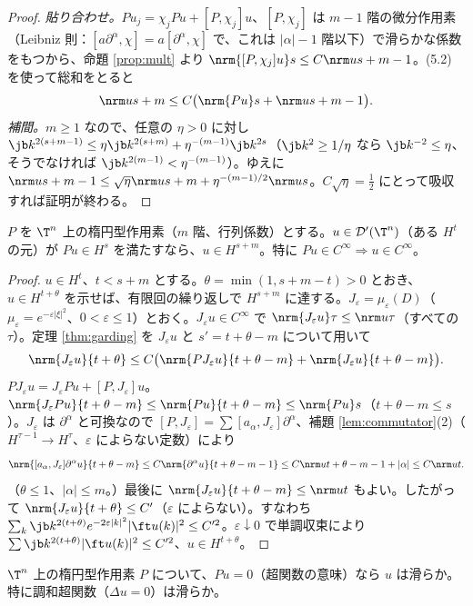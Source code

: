 \begin{proof}
\emph{貼り合わせ。}$Pu_j=\chi_jPu+[P,\chi_j]u$、$[P,\chi_j]$ は $m-1$ 階の微分作用素（Leibniz 則：$[a\partial^\alpha,\chi]=a[\partial^\alpha,\chi]$ で、これは $|\alpha|-1$ 階以下）で滑らかな係数をもつから、命題 \ref{prop:mult} より $\nrm{[P,\chi_j]u}s\le C\nrm u{s+m-1}$。(5.2) を使って総和をとると
\[
\nrm u{s+m}\le C\bigl(\nrm{Pu}s+\nrm u{s+m-1}\bigr).
\]
\emph{補間。}$m\ge1$ なので、任意の $\eta>0$ に対し $\jb k^{2(s+m-1)}\le\eta\jb k^{2(s+m)}+\eta^{-(m-1)}\jb k^{2s}$（$\jb k^2\ge1/\eta$ なら $\jb k^{-2}\le\eta$、そうでなければ $\jb k^{2(m-1)}<\eta^{-(m-1)}$）。ゆえに $\nrm u{s+m-1}\le\sqrt\eta\nrm u{s+m}+\eta^{-(m-1)/2}\nrm us$。$C\sqrt\eta=\frac12$ にとって吸収すれば証明が終わる。
\end{proof}

\begin{thm}[楕円正則性]\label{thm:regularity}\tP
$P$ を $\T^n$ 上の楕円型作用素（$m$ 階、行列係数）とする。$u\in\mathcal D'(\T^n)$（ある $H^t$ の元）が $Pu\in H^s$ を満たすなら、$u\in H^{s+m}$。特に $Pu\in C^\infty\Rightarrow u\in C^\infty$。
\end{thm}
\begin{proof}
$u\in H^t$、$t<s+m$ とする。$\theta=\min(1,s+m-t)>0$ とおき、$u\in H^{t+\theta}$ を示せば、有限回の繰り返しで $H^{s+m}$ に達する。$J_\varepsilon=\mu_\varepsilon(D)$（$\mu_\varepsilon=e^{-\varepsilon|\xi|^2}$、$0<\varepsilon\le1$）とおく。$J_\varepsilon u\in C^\infty$ で $\nrm{J_\varepsilon u}\tau\le\nrm u\tau$（すべての $\tau$）。定理 \ref{thm:garding} を $J_\varepsilon u$ と $s'=t+\theta-m$ について用いて
\[
\nrm{J_\varepsilon u}{t+\theta}\le C\bigl(\nrm{PJ_\varepsilon u}{t+\theta-m}+\nrm{J_\varepsilon u}{t+\theta-m}\bigr).
\]
$PJ_\varepsilon u=J_\varepsilon Pu+[P,J_\varepsilon]u$。$\nrm{J_\varepsilon Pu}{t+\theta-m}\le\nrm{Pu}{t+\theta-m}\le\nrm{Pu}s$（$t+\theta-m\le s$）。$J_\varepsilon$ は $\partial^\alpha$ と可換なので $[P,J_\varepsilon]=\sum[a_\alpha,J_\varepsilon]\partial^\alpha$、補題 \ref{lem:commutator}(2)（$H^{\tau-1}\to H^\tau$、$\varepsilon$ によらない定数）により
\[
\nrm{[a_\alpha,J_\varepsilon]\partial^\alpha u}{t+\theta-m}\le C\nrm{\partial^\alpha u}{t+\theta-m-1}\le C\nrm u{t+\theta-m-1+|\alpha|}\le C\nrm ut.
\]
（$\theta\le1$、$|\alpha|\le m$。）最後に $\nrm{J_\varepsilon u}{t+\theta-m}\le\nrm ut$ もよい。したがって $\nrm{J_\varepsilon u}{t+\theta}\le C'$（$\varepsilon$ によらない）。すなわち $\sum_k\jb k^{2(t+\theta)}e^{-2\varepsilon|k|^2}|\ft u(k)|^2\le C'^2$。$\varepsilon\downarrow0$ で単調収束により $\sum\jb k^{2(t+\theta)}|\ft u(k)|^2\le C'^2$、$u\in H^{t+\theta}$。
\end{proof}
\begin{cor}
$\T^n$ 上の楕円型作用素 $P$ について、$Pu=0$（超関数の意味）なら $u$ は滑らか。特に調和超関数（$\Delta u=0$）は滑らか。
\end{cor}

